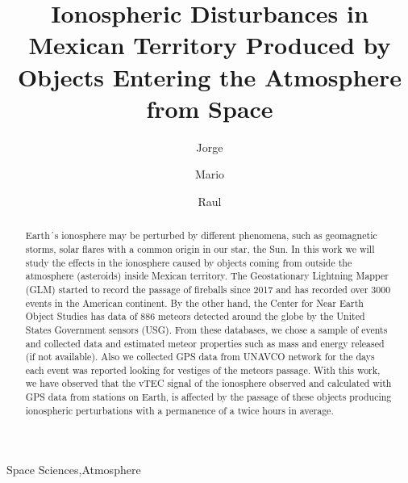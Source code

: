 \documentclass[times,twocolumn,final,authoryear]{elsarticle}
\begin{document}

\begin{frontmatter}

\title{Ionospheric Disturbances in Mexican Territory Produced by Objects Entering the Atmosphere from Space }%

\author[1]{Jorge }

\author[1]{Mario }
\author[1]{Raul }

\address[1]{Escuela Nacional de Estudios Superiores, UNAM, campus Morelia, Antigua Carretera a P\'atzcuaro No. 8701
Col. Ex Hacienda de San Jos\'e de la Huerta, Morelia, Michoac\'an, 58190, M\'exico}



\begin{abstract}
Earth´s ionosphere may be perturbed by different phenomena, such as %
geomagnetic storms, solar flares with a common origin in our star, the Sun. In this work we will study the effects in the ionosphere caused by objects coming from outside the atmosphere (asteroids) inside Mexican territory. The Geostationary Lightning Mapper (GLM) started to record the passage of fireballs since 2017 and has recorded over 3000 events in the American continent. By the other hand, the Center for Near Earth Object Studies has data of 886 meteors detected around the globe by the United States Government sensors (USG). From these databases, we chose a sample of events and collected data and estimated meteor properties such as mass and energy released (if not available). Also we collected GPS data from UNAVCO network for the days each event was reported looking for vestiges of the meteors passage. With this work, we have observed that the vTEC signal
 of the ionosphere observed and calculated with GPS data from stations on Earth, is affected by the passage of these objects producing ionospheric perturbations with a permanence of a twice hours in average.  
\end{abstract}

\begin{keyword}
\KWD Space Sciences\sep Atmosphere%
\end{keyword}

\end{frontmatter}
\end{document}
